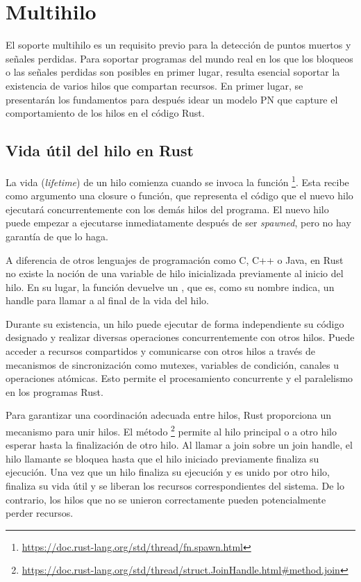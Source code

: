 \section{Multihilo}

El soporte multihilo es un requisito previo para la detección de puntos muertos y señales
perdidas. Para soportar programas del mundo real en los que los bloqueos o las señales
perdidas son posibles en primer lugar, resulta esencial soportar la existencia de varios hilos que
compartan recursos. En primer lugar, se presentarán los fundamentos para después idear un
modelo \acrshort{PN} que capture el comportamiento de los hilos en el código Rust.

\subsection{Vida útil del hilo en Rust}

La vida (\textit{lifetime}) de un hilo comienza cuando se invoca la función
\footnote{\url{https://doc.rust-lang.org/std/thread/fn.spawn.html}}.
Esta recibe como argumento una closure o función, que representa el
código que el nuevo hilo ejecutará concurrentemente con los demás hilos del programa. El
nuevo hilo puede empezar a ejecutarse inmediatamente después de ser \emph{spawned},
pero no hay garantía de que lo haga.

A diferencia de otros lenguajes de programación como C, C++ o Java, en Rust no existe la
noción de una variable de hilo inicializada previamente al inicio del hilo. En su lugar, la
función  devuelve un , que es, como su nombre
indica, un handle para llamar a  al final de la vida del hilo.

Durante su existencia, un hilo puede ejecutar de forma independiente su código designado y
realizar diversas operaciones concurrentemente con otros hilos. Puede acceder a recursos
compartidos y comunicarse con otros hilos a través de mecanismos de sincronización como
mutexes, variables de condición, canales u operaciones atómicas. Esto permite el
procesamiento concurrente y el paralelismo en los programas Rust.

Para garantizar una coordinación adecuada entre hilos, Rust proporciona un mecanismo
para unir hilos.
El método \footnote{\url{https://doc.rust-lang.org/std/thread/struct.JoinHandle.html\#method.join}}
permite al hilo principal o a otro hilo
esperar hasta la finalización de otro hilo. Al llamar a join sobre un join handle, el hilo
llamante se bloquea hasta que el hilo iniciado previamente finaliza su ejecución. Una vez que un hilo
finaliza su ejecución y es unido por otro hilo, finaliza su vida útil y se liberan los recursos
correspondientes del sistema. De lo contrario, los hilos que no se unieron correctamente
pueden potencialmente perder recursos.

